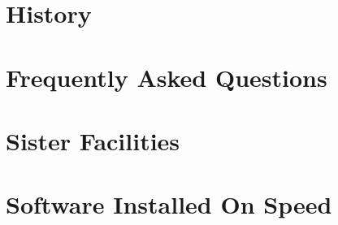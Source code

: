 \documentclass{easychair}
\begin{document}
\section{History}
\label{sect:history}




\section{Frequently Asked Questions}
\label{sect:faqs}

%



\section{Sister Facilities}
\label{sect:sister-facilities}



\section{Software Installed On Speed}
\label{sect:software-list}




\nocite{aosa-book-vol1}
\label{sect:bib}
%

%
%
%
\clearpage
{} 



\end{document}
